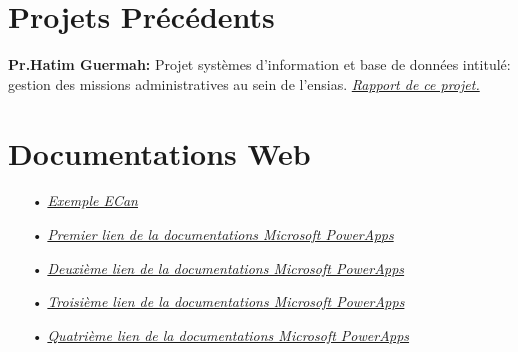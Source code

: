 \documentclass[a4paper]{report}
\begin{document}
\begin{doublespace}
\section{Projets Précédents}

\textbf{Pr.Hatim Guermah:} Projet systèmes d’information et base de données intitulé: gestion des missions
administratives au sein de l’ensias. \href{https://drive.google.com/file/d/13BZiRGEFTJO-wN1fIeIMevWrprIbC12t/view?usp=sharing}{\textit{Rapport de ce projet.}}
\section{Documentations Web}

\begin{itemize}
	\item[•] \href{https://powerapps.microsoft.com/fr-fr/blog/environment-canterbury-speeds-up-outcome-tracking-with-the-power-platform/}{\textit{Exemple ECan}}
	\item[•] \href{https://emea01.safelinks.protection.outlook.com/?url=https%3A%2F%2Fdocs.microsoft.com%2Fen-us%2Fpowerapps%2Fmaker%2Fcanvas-apps%2F&data=04%7C01%7C%7Ce65e3af41e9e410f992a08d95cc734ff%7C84df9e7fe9f640afb435aaaaaaaaaaaa%7C1%7C0%7C637642832931864679%7CUnknown%7CTWFpbGZsb3d8eyJWIjoiMC4wLjAwMDAiLCJQIjoiV2luMzIiLCJBTiI6Ik1haWwiLCJXVCI6Mn0%3D%7C1000&sdata=ml2KrrKcMUPLsWsH8d7ZDjdeXtLx9S985dY5hgI1RJI%3D&reserved=0}{\textit{Premier lien de la documentations Microsoft PowerApps}}
	\item[•] \href{https://emea01.safelinks.protection.outlook.com/?url=https%3A%2F%2Fdocs.microsoft.com%2Fen-us%2Fpowerapps%2Fmaker%2Fcanvas-apps%2Fget-started-create-from-data&data=04%7C01%7C%7Ce65e3af41e9e410f992a08d95cc734ff%7C84df9e7fe9f640afb435aaaaaaaaaaaa%7C1%7C0%7C637642832931869656%7CUnknown%7CTWFpbGZsb3d8eyJWIjoiMC4wLjAwMDAiLCJQIjoiV2luMzIiLCJBTiI6Ik1haWwiLCJXVCI6Mn0%3D%7C1000&sdata=TYbRoGvzIzwO4PThp3yUtywRr76KLIIUmJqSSvyN8MY%3D&reserved=0}{\textit{Deuxième lien de la documentations Microsoft PowerApps}}
	\item[•] \href{https://emea01.safelinks.protection.outlook.com/?url=https%3A%2F%2Fdocs.microsoft.com%2Fen-us%2Fpowerapps%2Fmaker%2Fcanvas-apps%2Fadd-form&data=04%7C01%7C%7Ce65e3af41e9e410f992a08d95cc734ff%7C84df9e7fe9f640afb435aaaaaaaaaaaa%7C1%7C0%7C637642832931874635%7CUnknown%7CTWFpbGZsb3d8eyJWIjoiMC4wLjAwMDAiLCJQIjoiV2luMzIiLCJBTiI6Ik1haWwiLCJXVCI6Mn0%3D%7C1000&sdata=S8RfTDyJ%2F3ZvtP4lwqBSSMAWrbXd85oLdXiEkFO6LLQ%3D&reserved=0}{\textit{Troisième lien de la documentations Microsoft PowerApps}}
	\item[•] \href{https://emea01.safelinks.protection.outlook.com/?url=https%3A%2F%2Fdocs.microsoft.com%2Fen-us%2Fpowerapps%2Fmaker%2Fcanvas-apps%2Fdependent-drop-down-lists&data=04%7C01%7C%7Ce65e3af41e9e410f992a08d95cc734ff%7C84df9e7fe9f640afb435aaaaaaaaaaaa%7C1%7C0%7C637642832931879615%7CUnknown%7CTWFpbGZsb3d8eyJWIjoiMC4wLjAwMDAiLCJQIjoiV2luMzIiLCJBTiI6Ik1haWwiLCJXVCI6Mn0%3D%7C1000&sdata=x8uoZpDPhhwkV%2FJhJFVIo4NZwVNOUULsb9etpMMT%2Bio%3D&reserved=0}{\textit{Quatrième lien de la documentations Microsoft PowerApps}}
\end{itemize}

\end{doublespace}
\end{document}
